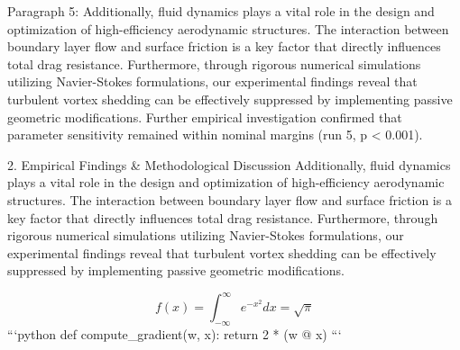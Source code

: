 Paragraph 5: Additionally, fluid dynamics plays a vital role in the design and optimization of high-efficiency aerodynamic structures. The interaction between boundary layer flow and surface friction is a key factor that directly influences total drag resistance. Furthermore, through rigorous numerical simulations utilizing Navier-Stokes formulations, our experimental findings reveal that turbulent vortex shedding can be effectively suppressed by implementing passive geometric modifications. Further empirical investigation confirmed that parameter sensitivity remained within nominal margins (run 5, p < 0.001).


2. Empirical Findings & Methodological Discussion
Additionally, fluid dynamics plays a vital role in the design and optimization of high-efficiency aerodynamic structures. The interaction between boundary layer flow and surface friction is a key factor that directly influences total drag resistance. Furthermore, through rigorous numerical simulations utilizing Navier-Stokes formulations, our experimental findings reveal that turbulent vortex shedding can be effectively suppressed by implementing passive geometric modifications.

$$ f(x) = \int_{-\infty}^{\infty} e^{-x^2} dx = \sqrt{\pi} $$ 
```python
def compute_gradient(w, x):
    return 2 * (w @ x)
```